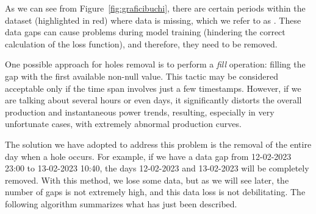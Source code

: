 As we can see from Figure~\ref{fig:graficibuchi}, there are certain
periods within the dataset (highlighted in red) where data is missing,
which we refer to as . These data gaps can cause problems during model training
(hindering the correct calculation of the loss function), and therefore,
they need to be removed.

One possible approach for holes removal
is to perform a \textit{fill} operation: filling the gap with the
first available non-null value. This tactic may be considered
acceptable only if the time span involves just a few timestamps.
However, if we are talking about several hours or even days, it
significantly distorts the overall production and instantaneous
power trends, resulting, especially in very unfortunate cases, with extremely abnormal production curves.

The solution we have adopted to address this problem is the removal of
the entire day when a hole occurs. For example, if we have a data
gap from 12-02-2023 23:00 to 13-02-2023 10:40, the days
12-02-2023 and 13-02-2023 will be completely removed. With this
method, we lose some data, but as we will see later, the number of
gaps is not extremely high, and this data loss is not
debilitating. The following algorithm summarizes what has
just been described.

